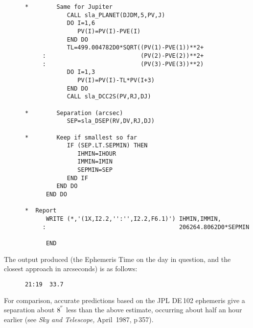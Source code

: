 \documentclass[11pt,twoside]{article}
\newcommand{\arcseci}[1] {$#1\hspace{-0.05em}$\raisebox{-0.5ex}
                         {$^{'\hspace{-0.1em}'}$}}
\renewcommand{\arcseci}[1] {$#1\hspace{-0.05em}^{'\hspace{-0.1em}'}$}
\begin{document}
\begin{verbatim}
      *        Same for Jupiter
                  CALL sla_PLANET(DJDM,5,PV,J)
                  DO I=1,6
                     PV(I)=PV(I)-PVE(I)
                  END DO
                  TL=499.004782D0*SQRT((PV(1)-PVE(1))**2+
           :                           (PV(2)-PVE(2))**2+
           :                           (PV(3)-PVE(3))**2)
                  DO I=1,3
                     PV(I)=PV(I)-TL*PV(I+3)
                  END DO
                  CALL sla_DCC2S(PV,RJ,DJ)

      *        Separation (arcsec)
                  SEP=sla_DSEP(RV,DV,RJ,DJ)

      *        Keep if smallest so far
                  IF (SEP.LT.SEPMIN) THEN
                     IHMIN=IHOUR
                     IMMIN=IMIN
                     SEPMIN=SEP
                  END IF
               END DO
            END DO

      *  Report
            WRITE (*,'(1X,I2.2,'':'',I2.2,F6.1)') IHMIN,IMMIN,
           :                                      206264.8062D0*SEPMIN

            END
\end{verbatim}
\goodbreak
The output produced (the Ephemeris Time on the day in question, and
the closest approach in arcseconds) is as follows:
\goodbreak
\begin{verbatim}
      21:19  33.7
\end{verbatim}
\goodbreak
For comparison, accurate predictions based on the JPL DE\,102 ephemeris
give a separation about \arcseci{8} less than
the above estimate, occurring about half an hour earlier
(see {\it Sky and Telescope,}\/ April~1987, p\,357).
\end{document}
